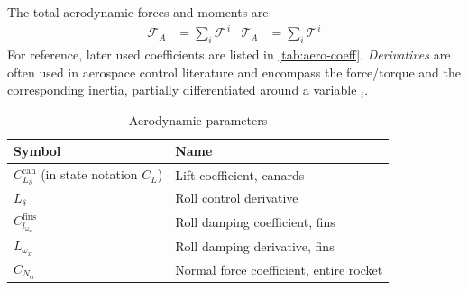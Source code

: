 The total aerodynamic forces and moments are 
\begin{align}
    \mathcal{F}_A &= \sum_i \mathcal{F}^{\,i} 
    & 
    \mathcal{T}_A &= \sum_i \mathcal{T}^{\,i}
\end{align}
For reference, later used coefficients are listed in \autoref{tab:aero-coeff}.
\textit{Derivatives} are often used in aerospace control literature and encompass the force/torque and the corresponding inertia, partially differentiated around a variable $_i$.

\begin{table}[ht]
\begin{center}
\begin{tabular}{l l}
Symbol & Name \\
\hline
$C^\text{can}_{L_\delta}$ (in state notation $C_L$) & Lift coefficient, canards \\
$L_\delta$ & Roll control derivative \\
$C^\text{fins}_{l_{\omega_x}}$ &  Roll damping coefficient, fins \\
$L_{\omega_x}$ & Roll damping derivative, fins \\
$C_{N_\alpha}$ & Normal force coefficient, entire rocket
\end{tabular}
\end{center}
\caption{Aerodynamic parameters} \label{tab:aero-coeff}
\end{table}

